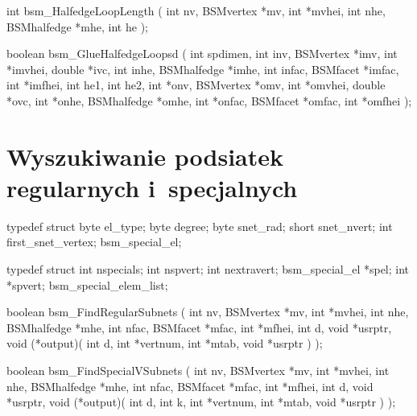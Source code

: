 \begin{listingC}
int bsm_HalfedgeLoopLength ( int nv, BSMvertex *mv, int *mvhei,
                             int nhe, BSMhalfedge *mhe,
                             int he );
\end{listingC}

\begin{listingC}
boolean bsm_GlueHalfedgeLoopsd ( int spdimen,
                     int inv, BSMvertex *imv, int *imvhei, double *ivc,
                     int inhe, BSMhalfedge *imhe,
                     int infac, BSMfacet *imfac, int *imfhei,
                     int he1, int he2,
                     int *onv, BSMvertex *omv, int *omvhei,
                     double *ovc,
                     int *onhe, BSMhalfedge *omhe,
                     int *onfac, BSMfacet *omfac, int *omfhei );
\end{listingC}


\newpage
\section{Wyszukiwanie podsiatek regularnych i~specjalnych}

\begin{listingC}
typedef struct {
    byte  el_type;
    byte  degree;
    byte  snet_rad;
    short snet_nvert;
    int   first_snet_vertex;
  } bsm_special_el;

typedef struct {
    int            nspecials;
    int            nspvert;
    int            nextravert;
    bsm_special_el *spel;
    int            *spvert;
  } bsm_special_elem_list;
\end{listingC}


\begin{listingC}
boolean bsm_FindRegularSubnets ( int nv, BSMvertex *mv, int *mvhei,
                         int nhe, BSMhalfedge *mhe,
                         int nfac, BSMfacet *mfac, int *mfhei,
                         int d, void *usrptr,
                         void (*output)( int d, int *vertnum, int *mtab,
                                         void *usrptr ) );
\end{listingC}

\begin{listingC}
boolean bsm_FindSpecialVSubnets ( int nv, BSMvertex *mv, int *mvhei,
                          int nhe, BSMhalfedge *mhe,
                          int nfac, BSMfacet *mfac, int *mfhei,
                          int d, void *usrptr,
                          void (*output)( int d, int k, int *vertnum,
                                          int *mtab, void *usrptr ) );
\end{listingC}

